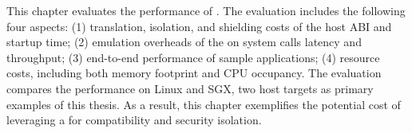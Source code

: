This chapter evaluates the performance of \graphene{}.
The evaluation
includes the following four aspects:
(1) translation, isolation, and shielding costs of the host ABI and startup time;
(2) emulation overheads of the \libos{} on system calls latency and throughput;
(3) end-to-end performance of sample applications;
(4) resource costs, including both memory footprint and CPU occupancy.
The evaluation compares
the performance
on Linux and SGX, two host targets as primary examples of this thesis.
As a result, this chapter exemplifies
the potential cost of leveraging a \libos{} for compatibility and security isolation.










